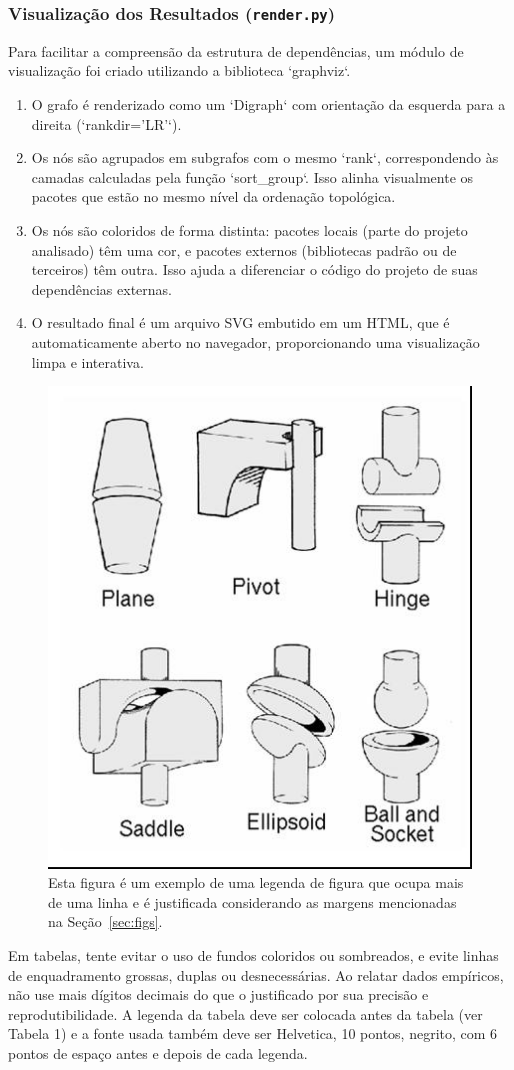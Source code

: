 \documentclass[12pt]{article}
\begin{document}
\subsubsection{Visualização dos Resultados (\texttt{render.py})}
Para facilitar a compreensão da estrutura de dependências, um módulo de visualização foi criado utilizando a biblioteca `graphviz`.
\begin{enumerate}
    \item O grafo é renderizado como um `Digraph` com orientação da esquerda para a direita (`rankdir='LR'`).
    \item Os nós são agrupados em subgrafos com o mesmo `rank`, correspondendo às camadas calculadas pela função `sort\_group`. Isso alinha visualmente os pacotes que estão no mesmo nível da ordenação topológica.
    \item Os nós são coloridos de forma distinta: pacotes locais (parte do projeto analisado) têm uma cor, e pacotes externos (bibliotecas padrão ou de terceiros) têm outra. Isso ajuda a diferenciar o código do projeto de suas dependências externas.
    \item O resultado final é um arquivo SVG embutido em um HTML, que é automaticamente aberto no navegador, proporcionando uma visualização limpa e interativa.
\end{enumerate}

\begin{figure}[ht]
\centering
\includegraphics[width=.3\textwidth]{fig2.jpg}
\caption{Esta figura é um exemplo de uma legenda de figura que ocupa mais de uma
linha e é justificada considerando as margens mencionadas na Seção~\ref{sec:figs}.}
\label{fig:exampleFig2}
\end{figure}

Em tabelas, tente evitar o uso de fundos coloridos ou sombreados, e evite
linhas de enquadramento grossas, duplas ou desnecessárias. Ao relatar dados empíricos,
não use mais dígitos decimais do que o justificado por sua precisão e
reprodutibilidade. A legenda da tabela deve ser colocada antes da tabela (ver Tabela 1)
e a fonte usada também deve ser Helvetica, 10 pontos, negrito, com 6 pontos de
espaço antes e depois de cada legenda.
\end{document}
